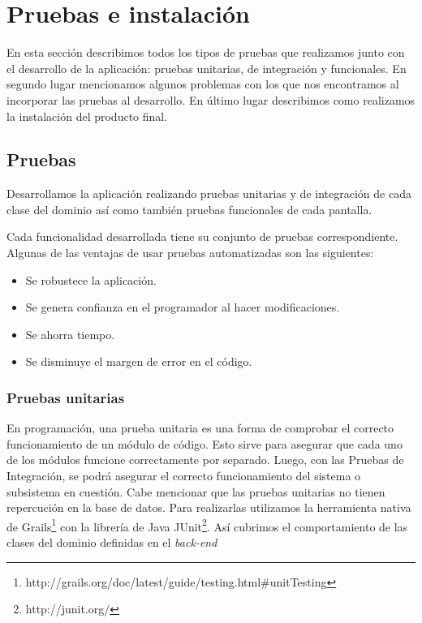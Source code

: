 \section{Pruebas e instalación}
En esta sección describimos todos los tipos de pruebas que realizamos junto con el desarrollo de la aplicación: pruebas unitarias, de integración y funcionales. En segundo lugar mencionamos algunos problemas con los que nos encontramos al incorporar las pruebas al desarrollo. En último lugar describimos como realizamos la instalación del producto final.

\subsection{Pruebas}
Desarrollamos la aplicación realizando pruebas unitarias y de integración de cada clase del dominio así como también pruebas funcionales de cada pantalla.

Cada funcionalidad desarrollada tiene su conjunto de pruebas correspondiente. Algunas de las ventajas de usar pruebas automatizadas son las siguientes:

\begin{itemize}
\item Se robustece la aplicación.
\item Se genera confianza en el programador al hacer modificaciones.
\item Se ahorra tiempo.
\item Se disminuye el margen de error en el código.
\end{itemize}

\subsubsection{Pruebas unitarias}
En programación, una prueba unitaria es una forma de comprobar el correcto funcionamiento de un módulo de código. Esto sirve para asegurar que cada uno de los módulos funcione correctamente por separado. Luego, con las Pruebas de Integración, se podrá asegurar el correcto funcionamiento del sistema o subsistema en cuestión. Cabe mencionar que las pruebas unitarias no tienen repercución en la base de datos. Para realizarlas utilizamos la herramienta nativa de Grails\footnote{http://grails.org/doc/latest/guide/testing.html\#unitTesting} con la librería de Java JUnit\footnote{http://junit.org/}. Así cubrimos el comportamiento de las clases del dominio definidas en el \textit{back-end}


